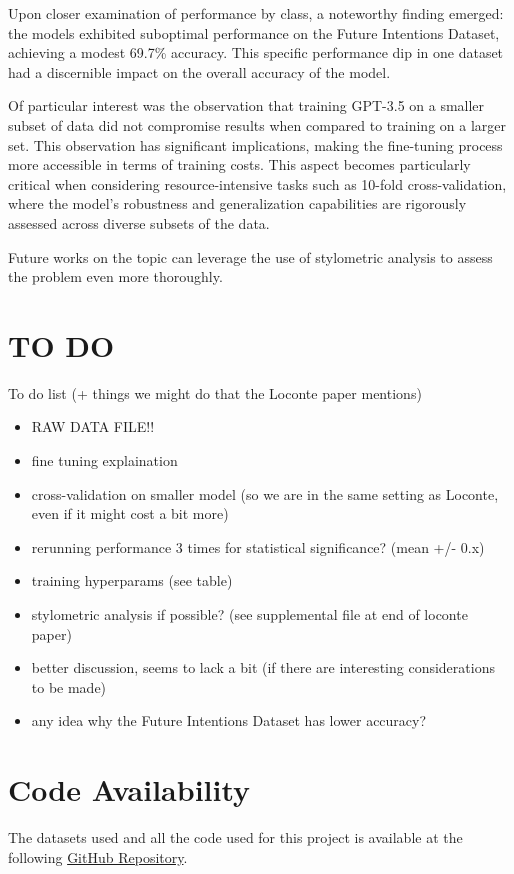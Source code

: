 \documentclass[10pt,twocolumn,letterpaper]{article}
\begin{document}
Upon closer examination of performance by class, a noteworthy finding emerged: the models exhibited 
suboptimal performance on the Future Intentions Dataset, achieving a modest 69.7\% accuracy. 
This specific performance dip in one dataset had a discernible impact on the overall accuracy of the model.

Of particular interest was the observation that training GPT-3.5 on a smaller subset of data did 
not compromise results when compared to training on a larger set. This observation has significant 
implications, making the fine-tuning process more accessible in terms of training costs. 
This aspect becomes particularly critical when considering resource-intensive tasks such as 
10-fold cross-validation, where the model's robustness and generalization capabilities are rigorously 
assessed across diverse subsets of the data.

Future works on the topic can leverage the use of stylometric analysis to assess the problem even more thoroughly.

\section{TO DO}
To do list (+ things we might do that the Loconte paper mentions)

\begin{itemize}
    \item RAW DATA FILE!!
    \item fine tuning explaination
    \item cross-validation on smaller model (so we are in the same setting as Loconte, even if it might cost a bit more)
    \item rerunning performance 3 times for statistical significance? (mean +/- 0.x)
    \item training hyperparams (see table)
    \item stylometric analysis if possible? (see supplemental file at end of loconte paper)
    \item better discussion, seems to lack a bit (if there are interesting considerations to be made)
    \item any idea why the Future Intentions Dataset has lower accuracy?
\end{itemize}

\section{Code Availability}
The datasets used and all the code used for this project is available
at the following \href{https://github.com/TannerAGraves/GPT-LieDetection/}{GitHub Repository}.
\end{document}
